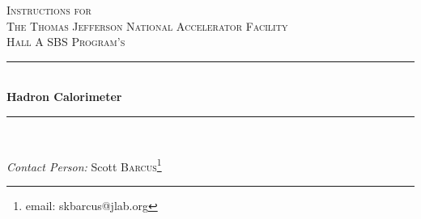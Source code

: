 \documentclass[oneside]{book}   %
\begin{document}
 
\frontmatter

\begin{titlepage} %
	\newcommand{\HRule}{\rule{\linewidth}{0.5mm}} %
	
	\center %
	
	
	\textsc{\LARGE Instructions for}\\[1.5cm] %
	
	\textsc{\Large The Thomas Jefferson National Accelerator Facility}\\[0.5cm] %
	
	\textsc{\large Hall A SBS Program's}\\[0.5cm] %
	
	
	\HRule\\[0.4cm]
	
	{\huge\bfseries Hadron Calorimeter}\\[0.4cm] %
	
	\HRule\\[1.5cm]
	
	
	\begin{minipage}{0.5\textwidth}
		\begin{center}
			\large
			\textit{Contact Person:}
			Scott \textsc{Barcus}\footnote{email: skbarcus@jlab.org} \newline
		\end{center}
	\end{minipage}
	
	
	
	

\end{titlepage}
\end{document}

